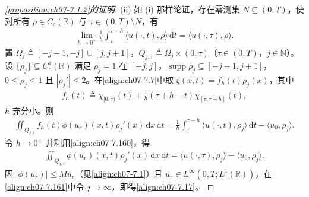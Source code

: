 \documentclass[../../main.tex]{subfiles}%
\begin{document}
\begin{proof}[\cref{proposition:ch07-7.1.2}的证明]
(ii) 如 (i) 那样论证，存在零测集 $N\subseteq(0,T)$，使对所有 $\rho\in C_c(\mathbb{R})$ 与 $\tau\in(0,T)\setminus N$，有
\begin{align}
\lim_{h\to0^+}\frac1h\int_\tau^{\tau+h}\langle u(\cdot,t),\rho\rangle\,\mathrm{d}t=\langle u(\cdot,\tau),\rho\rangle. \label{align:ch07-7.160}
\end{align}
置 $\Omega_j\triangleq [-j-1,-j]\cup[j,j+1]$，$Q_{j,\tau}\triangleq \Omega_j\times(0,\tau)$（$\tau\in(0,T)$，$j\in\mathbb{N}$）。设 $\{\rho_j\}\subseteq C^1_c(\mathbb{R})$ 满足 $\rho_j=1$ 在 $[-j,j]$，$\operatorname{supp}\rho_j\subseteq[-j-1,j+1]$，$0\leqslant\rho_j\leqslant1$ 且 $|\rho_j'|\leqslant2$。在\eqref{align:ch07-7.7}中取 $\zeta(x,t)=f_h(t)\rho_j(x)$，其中
\begin{align*}
f_h(t)\triangleq \chi_{[0,\tau)}(t)+\frac1h(\tau+h-t)\chi_{[\tau,\tau+h]}(t),
\end{align*}
$h$ 充分小。则
\begin{align*}
\iint_{Q_{j,\tau}}f_h(t)\phi(u_r)(x,t)\rho_j'(x)\,\mathrm{d}x\,\mathrm{d}t
=\frac1h\int_\tau^{\tau+h}\langle u(\cdot,t),\rho_j\rangle\,\mathrm{d}t-\langle u_0,\rho_j\rangle.
\end{align*}
令 $h\to0^+$ 并利用\eqref{align:ch07-7.160}，得
\begin{align}
\iint_{Q_{j,\tau}}\phi(u_r)(x,t)\rho_j'(x)\,\mathrm{d}x\,\mathrm{d}t
=\langle u(\cdot,\tau),\rho_j\rangle-\langle u_0,\rho_j\rangle. \label{align:ch07-7.161}
\end{align}
因 $|\phi(u_r)|\leqslant Mu_r$（见\eqref{align:ch07-7.1}）且 $u_r\in L^\infty(0,T;L^1(\mathbb{R}))$，在\eqref{align:ch07-7.161}中令 $j\to\infty$，即得\eqref{align:ch07-7.17}。
\end{proof}
\end{document}
